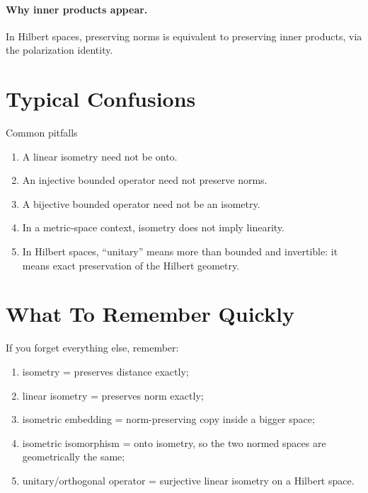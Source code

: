 \documentclass[11pt]{article}
\begin{document}
\paragraph{Why inner products appear.}
In Hilbert spaces, preserving norms is equivalent to preserving inner products, via the polarization identity.

\section{Typical Confusions}

\begin{warningbox}{Common pitfalls}
\begin{enumerate}
\item A linear isometry need not be onto.
\item An injective bounded operator need not preserve norms.
\item A bijective bounded operator need not be an isometry.
\item In a metric-space context, isometry does not imply linearity.
\item In Hilbert spaces, ``unitary'' means more than bounded and invertible: it means exact preservation of the Hilbert geometry.
\end{enumerate}
\end{warningbox}

\section{What To Remember Quickly}

\begin{focusbox}
If you forget everything else, remember:
\begin{enumerate}
\item isometry = preserves distance exactly;
\item linear isometry = preserves norm exactly;
\item isometric embedding = norm-preserving copy inside a bigger space;
\item isometric isomorphism = onto isometry, so the two normed spaces are geometrically the same;
\item unitary/orthogonal operator = surjective linear isometry on a Hilbert space.
\end{enumerate}
\end{focusbox}
\end{document}

